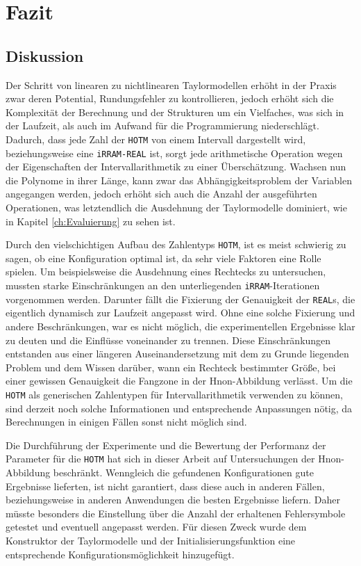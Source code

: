 
\chapter{Fazit}
\label{ch:fazit}

\section{Diskussion}
Der Schritt von linearen zu nichtlinearen Taylormodellen erhöht in der Praxis zwar deren Potential, Rundungsfehler zu kontrollieren, jedoch erhöht sich die Komplexität der Berechnung und der Strukturen um ein Vielfaches, was sich in der Laufzeit, als auch im Aufwand für die Programmierung niederschlägt. Dadurch, dass jede Zahl der \verb+HOTM+ von einem Intervall dargestellt wird, beziehungsweise eine \verb+iRRAM-REAL+ ist, sorgt jede arithmetische Operation wegen der Eigenschaften der Intervallarithmetik zu einer Überschätzung. Wachsen nun die Polynome in ihrer Länge, kann zwar das Abhängigkeitsproblem der Variablen angegangen werden, jedoch erhöht sich auch die Anzahl der ausgeführten Operationen, was letztendlich die Ausdehnung der Taylormodelle dominiert, wie in Kapitel \ref{ch:Evaluierung} zu sehen ist. 

Durch den vielschichtigen Aufbau des Zahlentyps \verb+HOTM+, ist es meist schwierig zu sagen, ob eine Konfiguration optimal ist, da sehr viele Faktoren eine Rolle spielen. Um beispielsweise die Ausdehnung eines Rechtecks zu untersuchen, mussten starke Einschränkungen an den unterliegenden \verb+iRRAM+-Iterationen vorgenommen werden. Darunter fällt die Fixierung der Genauigkeit der \verb+REAL+s, die eigentlich dynamisch zur Laufzeit angepasst wird. Ohne eine solche Fixierung und andere Beschränkungen, war es nicht möglich, die experimentellen Ergebnisse klar zu deuten und die Einflüsse voneinander zu trennen. Diese Einschränkungen entstanden aus einer längeren Auseinandersetzung mit dem zu Grunde liegenden Problem und dem Wissen darüber, wann ein Rechteck bestimmter Größe, bei einer gewissen Genauigkeit die Fangzone in der H\e non-Abbildung verlässt. Um die \verb+HOTM+ als generischen Zahlentypen für Intervallarithmetik verwenden zu können, sind derzeit noch solche Informationen und entsprechende Anpassungen nötig, da Berechnungen in einigen Fällen sonst nicht möglich sind.


Die Durchführung der Experimente und die Bewertung der Performanz der Parameter für die \verb+HOTM+ hat sich in dieser Arbeit auf Untersuchungen der H\e non-Abbildung beschränkt. Wenngleich die gefundenen Konfigurationen gute Ergebnisse lieferten, ist nicht garantiert, dass diese auch in anderen Fällen, beziehungsweise in anderen Anwendungen die besten Ergebnisse liefern. Daher müsste besonders die Einstellung über die Anzahl der erhaltenen Fehlersymbole getestet und eventuell angepasst werden. Für diesen Zweck wurde dem Konstruktor der Taylormodelle und der Initialisierungsfunktion eine entsprechende Konfigurationsmöglichkeit hinzugefügt. 

